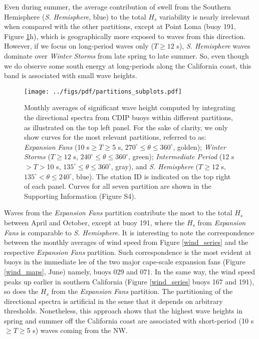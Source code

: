 Even during summer, the average contribution of swell from the Southern Hemisphere (\textit{S. Hemisphere}, blue) to the total $H_s$ variability is nearly irrelevant when compared with the other partitions, except at Point Loma (buoy 191, Figure \ref{partitions}h), which is geographically more exposed to waves from this direction. However, if we focus on long-period waves only ($T \geq 12$ s), \textit{S. Hemisphere} waves dominate over \textit{Winter Storms} from late spring to late summer. So, even though we do observe some south energy at long-periods along the California coast, this band is associated with small wave heights.
\begin{figure}[h]
\centering
\texttt{[image: ../figs/pdf/partitions\_subplots.pdf]}
\caption{Monthly averages of significant wave height computed by integrating the directional spectra from CDIP buoys within different partitions, as illustrated on the top left panel. For the sake of clarity, we only show curves for the most relevant partitions, referred to as: \textit{Expansion Fans} (10 s$\geq T\geq$5 s, $270^\circ\leq\theta\leq360^\circ$, golden); \textit{Winter Storms} ($T \geq 12$ s, $240^\circ \leq \theta \leq 360^\circ$, green); \textit{Intermediate Period} (12 s$>T> $10 s, $135^\circ \leq \theta \leq 360^\circ$, gray), and \textit{S. Hemisphere} ($T\geq12$ s, $135^\circ<\theta\leq240^\circ$, blue). The station ID is indicated on the top right of each panel. Curves for all seven partition are shown in the Supporting Information (Figure S4).}
\label{partitions}
\end{figure}
Waves from the \textit{Expansion Fans} partition contribute the most to the total $H_s$ between April and October, except at buoy 191, where the $H_s$ from \textit{Expansion Fans} is comparable to \textit{S. Hemisphere}. It is interesting to note the correspondence between the monthly averages of wind speed from Figure \ref{wind_series} and the respective \textit{Expansion Fans} partition. Such correspondence is the most evident at buoys in the immediate lee of the two major cape-scale expansion fans (Figure \ref{wind_maps}, June) namely, buoys 029 and 071. In the same way, the wind speed peaks up earlier in southern California (Figure \ref{wind_series} buoys 167 and 191), so does the $H_s$ from the \textit{Expansion Fans} partition. The partitioning of the directional spectra is artificial in the sense that it depends on arbitrary thresholds. Nonetheless, this approach shows that the highest wave heights in spring and summer off the California coast are associated with short-period (10 s$\geq T\geq$5 s) waves coming from the NW.


